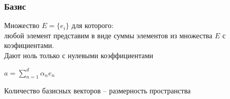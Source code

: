 \documentclass[14pt]{beamer}
\begin{document}

\begin{frame}
\frametitle{Базис}
	Множество \( E=\{e_i\}\) для которого:\\
	любой элемент представим в виде суммы элементов из множества $E$ с коэфициентами.\\
	Дают ноль только с нулевыми коэффициентами\\
	\begin{center}
	\( a=\sum_{n=1}^{d} \alpha_n e_n\)\\
	\end{center}
Количество базисных векторов -- размерность пространства
\end{frame}
\end{document}

